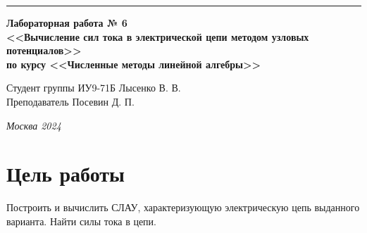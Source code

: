 \documentclass[a4paper, 14pt]{extarticle}
\begin{document}
\begin{titlepage}
\vspace*{-16pt}
\hspace{30pt}\rule{0.866\textwidth}{0.4pt}
  
\vspace{11em}

\begin{center}
\Large {\bf Лабораторная работа № 6} \\ 
\large {\bf<<Вычисление сил тока в электрической цепи методом узловых потенциалов>>} \\ 
\large {\bf по курсу <<Численные методы линейной алгебры>>} \\ 
\end{center}\normalsize

\vspace{8em}


\begin{flushright}
  {Студент группы ИУ9-71Б Лысенко В. В.\hspace*{15pt} \\
  \vspace{2ex}
  Преподаватель Посевин Д. П.\hspace*{15pt}}
\end{flushright}

\bigskip

\vfill
 

\begin{center}
\textsl{Москва 2024}
\end{center}
\end{titlepage}

\renewcommand{\ttdefault}{pcr}

\setlength{\tabcolsep}{3pt}
\newpage
\setcounter{page}{2}

\section{Цель работы}\label{Sect::task}
\par
\renewcommand{\labelenumii}{\arabic{enumi}.\arabic{enumii}.}
Построить и вычислить СЛАУ, характеризующую электрическую цепь выданного варианта. Найти силы тока в цепи. 
\end{document}
